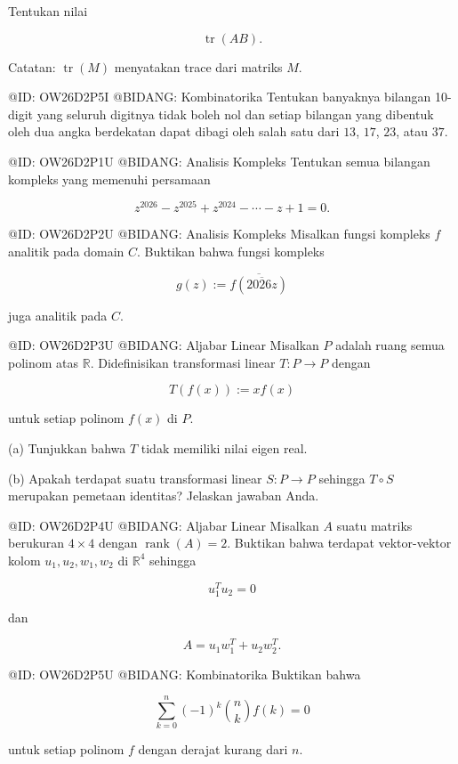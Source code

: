 Tentukan nilai

$$
\operatorname{tr}(AB).
$$

Catatan: $\operatorname{tr}(M)$ menyatakan trace dari matriks $M$.

@ID: OW26D2P5I
@BIDANG: Kombinatorika
Tentukan banyaknya bilangan 10-digit yang seluruh digitnya tidak boleh nol dan setiap bilangan yang dibentuk oleh dua angka berdekatan dapat dibagi oleh salah satu dari $13$, $17$, $23$, atau $37$.

@ID: OW26D2P1U
@BIDANG: Analisis Kompleks
Tentukan semua bilangan kompleks yang memenuhi persamaan

$$
z^{2026}-z^{2025}+z^{2024}-\cdots-z+1=0.
$$

@ID: OW26D2P2U
@BIDANG: Analisis Kompleks
Misalkan fungsi kompleks $f$ analitik pada domain $C$. Buktikan bahwa fungsi kompleks

$$
g(z):=\overline{f(\overline{2026z})}
$$

juga analitik pada $C$.

@ID: OW26D2P3U
@BIDANG: Aljabar Linear
Misalkan $P$ adalah ruang semua polinom atas $\mathbb{R}$. Didefinisikan transformasi linear $T:P\to P$ dengan

$$
T(f(x)):=xf(x)
$$

untuk setiap polinom $f(x)$ di $P$.

(a) Tunjukkan bahwa $T$ tidak memiliki nilai eigen real.

(b) Apakah terdapat suatu transformasi linear $S:P\to P$ sehingga $T\circ S$ merupakan pemetaan identitas? Jelaskan jawaban Anda.

@ID: OW26D2P4U
@BIDANG: Aljabar Linear
Misalkan $A$ suatu matriks berukuran $4\times4$ dengan $\operatorname{rank}(A)=2$. Buktikan bahwa terdapat vektor-vektor kolom $u_1,u_2,w_1,w_2$ di $\mathbb{R}^4$ sehingga

$$
u_1^Tu_2=0
$$

dan

$$
A=u_1w_1^T+u_2w_2^T.
$$

@ID: OW26D2P5U
@BIDANG: Kombinatorika
Buktikan bahwa

$$
\sum_{k=0}^{n}
(-1)^k
\binom{n}{k}
f(k)=0
$$

untuk setiap polinom $f$ dengan derajat kurang dari $n$.